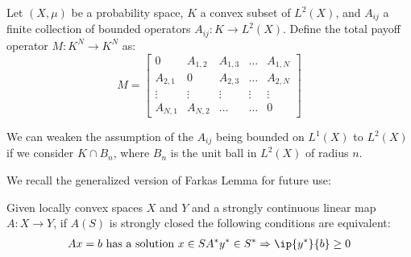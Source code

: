 \begin{definition}
  \label{def:total_payoff}
  Let $(X,\mu)$ be a probability space, $K$ a convex subset of $L^2(X)$, and $A_{ij}$ a finite collection of bounded operators $A_{ij}: K \to L^2(X)$. Define the total payoff operator $M:K^N \to K^N$ as:
  \begin{equation}
    M =
    \begin{bmatrix}
        0 & A_{1,2} & A_{1,3} &\dots & A_{1,N} \\
        A_{2,1} & 0 & A_{2,3} &\dots & A_{2,N} \\
        \vdots & \vdots & \vdots & \vdots & \vdots \\
        A_{N,1} & A_{N,2} & \dots & \dots & 0
    \end{bmatrix}
  \end{equation}
\end{definition}
\begin{remark}
  We can weaken the assumption of the $A_{ij}$ being bounded on $L^1(X)$ to $L^2(X)$ if we consider $K\cap B_n$, where $B_n$ is the unit ball in $L^2(X)$ of radius $n$.
\end{remark}
We recall the generalized version of Farkas Lemma for future use:
\begin{lemma}
  \label{lem:farkas_lemma}
Given locally convex spaces $X$ and $Y$ and a strongly continuous linear map $A:X\to Y$, if $A(S)$ is strongly closed the following conditions are equivalent:
  \begin{align}
    Ax = b \text{ has a solution } x\in S
    A^* y^* \in S^* \Rightarrow \ip{y^*}{b} \geq 0
  \end{align}
\end{lemma}

